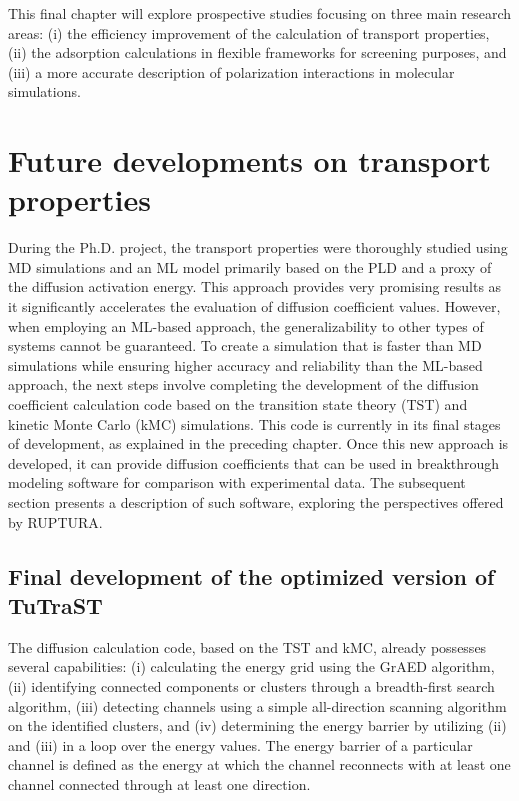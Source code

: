 \documentclass[main]{subfiles}
\begin{document}
This final chapter will explore prospective studies focusing on three main research areas: (i) the efficiency improvement of the calculation of transport properties, (ii) the adsorption calculations in flexible frameworks for screening purposes, and (iii) a more accurate description of polarization interactions in molecular simulations.

\section{Future developments on transport properties}

During the Ph.D. project, the transport properties were thoroughly studied using MD simulations and an ML model primarily based on the PLD and a proxy of the diffusion activation energy. This approach provides very promising results as it significantly accelerates the evaluation of diffusion coefficient values. However, when employing an ML-based approach, the generalizability to other types of systems cannot be guaranteed. To create a simulation that is faster than MD simulations while ensuring higher accuracy and reliability than the ML-based approach, the next steps involve completing the development of the diffusion coefficient calculation code based on the transition state theory (TST) and kinetic Monte Carlo (kMC) simulations. This code is currently in its final stages of development, as explained in the preceding chapter. Once this new approach is developed, it can provide diffusion coefficients that can be used in breakthrough modeling software for comparison with experimental data. The subsequent section presents a description of such software, exploring the perspectives offered by RUPTURA\autocite{Sharma_2023}.

\subsection{Final development of the optimized version of TuTraST}

The diffusion calculation code, based on the TST and kMC, already possesses several capabilities: (i) calculating the energy grid using the GrAED algorithm, (ii) identifying connected components or clusters through a breadth-first search algorithm, (iii) detecting channels using a simple all-direction scanning algorithm on the identified clusters, and (iv) determining the energy barrier by utilizing (ii) and (iii) in a loop over the energy values. The energy barrier of a particular channel is defined as the energy at which the channel reconnects with at least one channel connected through at least one direction.
\end{document}
